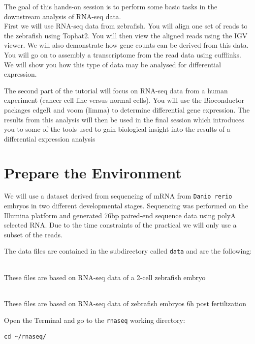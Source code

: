 The goal of this hands-on session is to perform some basic tasks in the downstream analysis of RNA-seq data.\\

 

First we will use RNA-seq data from zebrafish.  You will align one set of reads to the zebrafish using Tophat2. You will then  view the aligned reads using the IGV viewer. We will also demonstrate how gene counts can be derived from this data.  You will go on to assembly a transcriptome from the read data using cufflinks. We will show you how this type of data may be analysed for differential expression.

 

The second part of the tutorial will focus on RNA-seq data from a human experiment (cancer cell line versus normal cells). You will use the Bioconductor packages edgeR and voom (limma) to determine differential gene expression. The results from this analysis will then be used in the final session which introduces you to some of the tools used to gain biological insight into the results of a differential expression analysis


\section{Prepare the Environment}
We will use a dataset derived from sequencing of mRNA from \texttt{Danio rerio} embryos
in two different developmental stages. Sequencing was performed on the Illumina
platform and generated 76bp paired-end sequence data using polyA selected RNA.
Due to the time constraints of the practical we will only use a subset of the
reads.

The data files are contained in the subdirectory called \texttt{data} and are
the following:
\begin{description}[style=multiline,labelindent=1.5cm,align=left,leftmargin=2.5cm]
  \item[\texttt{2cells\_1.fastq} and \texttt{2cells\_2.fastq}] \hfill\\
 These files are based on RNA-seq data of a 2-cell zebrafish embryo
  \item[\texttt{6h\_1.fastq} and \texttt{6h\_2.fastq}] \hfill\\
 These files are based on RNA-seq data of zebrafish embryos 6h post
 fertilization
\end{description}

\begin{steps}
Open the Terminal and go to the \texttt{rnaseq} working directory:
\begin{lstlisting}
cd ~/rnaseq/
\end{lstlisting}
\end{steps}

